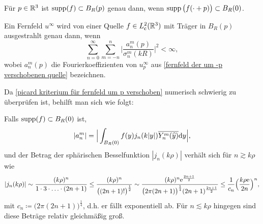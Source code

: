 Für \(p\in\mathbb{R}^3\) ist \(\operatorname{supp}(f)\subset B_R(p)\) genau dann, wenn \(\operatorname{supp}\big(f(\cdot+p)\big)\subset B_R(0)\).
\begin{cor}\label{kor: wann wird fernfeld von quelle ausgestrahlt? analogon picard}
	Ein Fernfeld \(u^\infty\) wird von einer Quelle \(f\in L_{\mathrm{c}}^2(\mathbb{R}^3)\) mit Träger in \(B_R(p)\) ausgestrahlt genau dann, wenn
	\begin{equation}
		\label{picard kriterium für fernfeld um p verschoben}
		\sum_{n=0}^\infty\sum_{m=-n}^n\Big|\frac{a_n^m(p)}{\sigma_n^m(kR)}\Big|^2<\infty,
	\end{equation}
	wobei \(a_n^m(p)\) die Fourierkoeffizienten von \(u_p^\infty\) aus \eqref{fernfeld der um -p verschobenen quelle} bezeichnen.
\end{cor}
Da \eqref{picard kriterium für fernfeld um p verschoben} numerisch schwierig zu überprüfen ist, behilft man sich wie folgt:\vspace{1.5mm}

\noindent Falls \(\operatorname{supp}(f)\subset B_R(0)\) ist,
\begin{equation*}
	|a_n^m|= \Big|\int_{B_R(0)}f(y)j_n(k|y|)\overline{Y_n^m(\widehat{y})}\mathrm{d}y\Big|,
\end{equation*}
und der Betrag der sphärischen Besselfunktion \(|j_n(k\rho)|\) verhält sich für \(n\gtrsim k\rho\) wie
\begin{equation*}
	|j_n(k\rho)|
	\sim\frac{(k\rho)^n}{1\cdot3\cdot\ldots\cdot(2n+1)}
	\leq\frac{(k\rho)^n}{\big((2n+1)!\big)^\frac{1}{2}}
	\sim\frac{(k\rho)^n\mathrm{e}^{\frac{2n+1}{2}}}{\big(2\pi(2n+1)\big)^\frac{1}{4}(2n+1)^\frac{2n+1}{2}}
	\leq\frac{1}{c_n}\Big(\frac{k\rho\mathrm{e}}{2n}\Big)^n,
\end{equation*}
mit \(c_n\coloneqq\big(2\pi(2n+1)\big)^\frac{1}{4}\), d.h. er fällt exponentiell ab. Für \(n\lesssim k\rho\) hingegen sind diese Beträge \glqq{}relativ gleichmäßig groß\grqq{}.\vspace{18mm}


